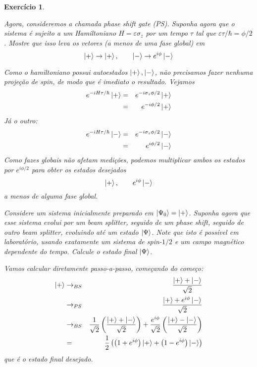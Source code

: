 \documentclass[12pt]{article}
\def\be{\begin{equation}}
\def\ee{\end{equation}}
\def\bea{\begin{eqnarray*}}
\def\eea{\end{eqnarray*}}
\def\f{\frac}
\def\l{\left}
\def\r{\right}
\newtheorem{exercise}{Exercício}
\begin{document}
\begin{exercise}
\begin{exercises}
			\item Agora, consideremos a chamada phase shift gate (PS). Suponha agora que o
			sistema é sujeito a um Hamiltoniano $H=\varepsilon\sigma_z$ por um tempo $\tau$ tal que $\varepsilon\tau/\hbar = \phi/2$. Mostre que isso leva os vetores (a menos de uma fase global) em
			\be
				\ket{+} \to \ket{+}, \quad\quad \ket{-} \to e^{i\phi}\ket{-}
			\ee
			\begin{multianswer}
				Como o hamiltoniano possui autoestados $\ket{+}, \ket{-}$, não precisamos fazer nenhuma projeção de spin, de modo que é imediato o resultado. Vejamos
				\bea
					e^{-iH\tau/\hbar}\ket{+} &=& e^{-i\sigma_z\phi/2} \ket{+} \\
						&=& e^{-i\phi/2} \ket{+}
				\eea
				Já o outro:
				\bea
					e^{-iH\tau/\hbar}\ket{-} &=& e^{-i\sigma_z\phi/2} \ket{-} \\
					&=& e^{i\phi/2} \ket{-} 
				\eea
				Como fazes globais não afetam medições, podemos multiplicar ambos os estados por $e^{i\phi/2}$ para obter os estados desejados
				\be
					\ket{+}, \quad\quad e^{i\phi}\ket{-}
				\ee
				a menos de alguma fase global. 
			\end{multianswer}
			
			\item Considere um sistema inicialmente preparado em $\ket{\Psi_0}=\ket{+}$. Suponha agora que esse sistema evolui por um beam splitter, seguido de um phase shift, seguido de outro beam splitter, evoluindo até um estado $\ket{\Psi}$. Note que isto é possível em laboratório, usando exatamente um sistema de spin-$1/2$ e um campo magnético dependente do tempo. Calcule o estado final  $\ket{\Psi}$.
			\begin{multianswer}
				Vamos calcular diretamente passo-a-passo, começando do começo:
				\bea
					\ket{+} &\to_{BS}& \f{\ket{+} + \ket{-}}{\sqrt{2}} \\
						&\to_{PS}& \f{\ket{+} + e^{i\phi}\ket{-}}{\sqrt{2}} \\
						&\to_{BS}& \f{1}{\sqrt{2}} \l( \f{\ket{+} + \ket{-}}{\sqrt{2}}\r) + \f{e^{i\phi}}{\sqrt{2}} \l( \f{\ket{+} - \ket{-}}{\sqrt{2}} \r) \\
						&=& \f{1}{2} \l( \l(1 + e^{i\phi} \r)\ket{+} + \l(1 - e^{i\phi} \r) \ket{-} \r)
				\eea
				que é o estado final desejado.				
			\end{multianswer}
			

\end{exercises}
\end{exercise}
\end{document}
